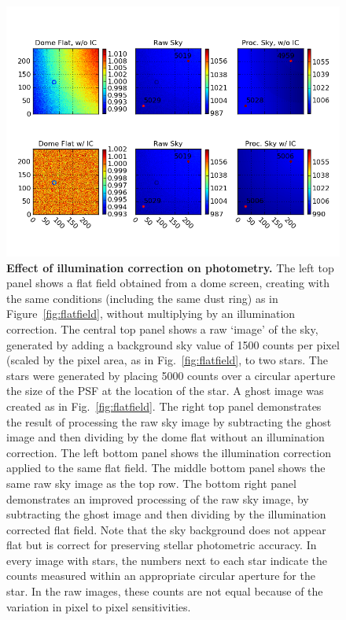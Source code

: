 \documentclass[12pt,preprint]{aastex}
\begin{document}
\begin{figure}[htbp]
\includegraphics[width=6in]{ICeffect}
\caption{ {\small
{\bf Effect of illumination correction on photometry.}
The left top panel shows a flat field obtained from a dome screen,
creating with the same conditions (including the same dust ring) as in Figure~\ref{fig:flatfield},
without multiplying by an illumination correction. The central top
panel shows a raw `image' of the sky, generated by adding a background
sky value of 1500 counts per pixel (scaled by the pixel area, as in
Fig.~\ref{fig:flatfield}, to two stars. The stars were generated by
placing 5000 counts over a circular aperture the size of the PSF at
the location of the star. A ghost image was created as in
Fig.~\ref{fig:flatfield}.  The right top panel demonstrates the result
of processing the raw sky image by subtracting the ghost image and
then dividing by the dome flat without an
illumination correction. 
The left bottom panel shows the illumination correction applied to the
same flat field. The middle bottom panel shows the same raw sky image as
the top row. The bottom right panel demonstrates an improved processing
of the raw sky image, by subtracting the ghost image and then dividing
by the illumination corrected flat field. 
Note that the sky background does not appear
flat but is correct for preserving stellar photometric accuracy. 
In every image with stars, the numbers next to each star indicate the
counts measured within an appropriate circular aperture for the
star. In the raw images, these counts are not equal because of the
variation in pixel to pixel sensitivities. }} \label{fig:iceffect} 
\end{figure}
\end{document}
